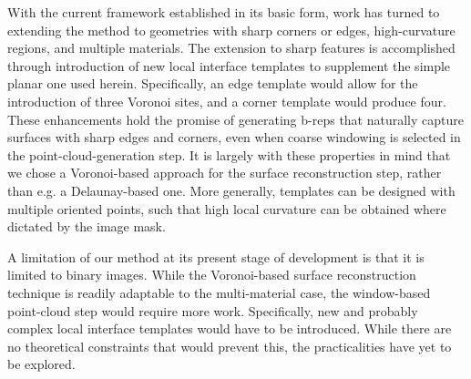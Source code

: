 With the current framework established in its basic form, work has turned to extending the method to geometries with sharp corners or edges, high-curvature regions, and multiple materials.  The extension to sharp features is accomplished through introduction of new local interface templates to supplement the simple planar one used herein.  Specifically, an edge template would allow for the introduction of three Voronoi sites, and a corner template would produce four. These enhancements hold the promise of generating b-reps that naturally capture surfaces with sharp edges and corners, even when coarse windowing is selected in the point-cloud-generation step.  It is largely with these properties in mind that we chose a Voronoi-based approach for the surface reconstruction step, rather than e.g. a Delaunay-based one.   More generally, templates can be designed with multiple oriented points, such that high local curvature can be obtained where dictated by the image mask.  

A limitation of our method at its present stage of development is that it is limited to binary images.  While the Voronoi-based surface reconstruction technique is readily adaptable to the multi-material case, the window-based point-cloud step would require more work.  Specifically, new and probably complex local interface templates would have to be introduced.  While there are no theoretical constraints that would prevent this, the practicalities have yet to be explored.